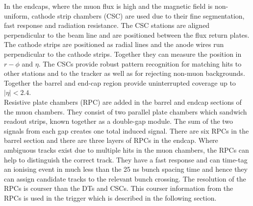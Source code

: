 In the endcaps, where the muon flux is high and the magnetic field is non-uniform, cathode strip chambers (CSC) are used due to their fine segmentation, fast response and radiation resistance. The CSC stations are aligned perpendicular to the beam line and are positioned between the flux return plates. The cathode strips are positioned as radial lines and the anode wires run perpendicular to the cathode strips. Together they can measure the position in $r-\phi$ and $\eta$. The CSCs provide robust pattern recognition for matching hits to other stations and to the tracker as well as for rejecting non-muon backgrounds. 
Together the barrel and end-cap region provide uninterrupted coverage up to $|\eta|<2.4$.\\
Resistive plate chambers (RPC) are added in the barrel and endcap sections of the muon chambers. They consist of two parallel plate chambers which sandwich readout strips, known together as a double-gap module. The sum of the two signals from each gap creates one total induced signal. There are six RPCs in the barrel section and there are three layers of RPCs in the endcap.
Where ambiguous tracks exist due to multiple hits in the muon chambers, the RPCs can help to distinguish the correct track. They have a fast response and can time-tag an ionising event in much less than the 25 ns bunch spacing time and hence they can assign candidate tracks to the relevant bunch crossing. The resolution of the RPCs is courser than the DTs and CSCs. This courser information from the RPCs is used in the trigger which is described in the following section.

